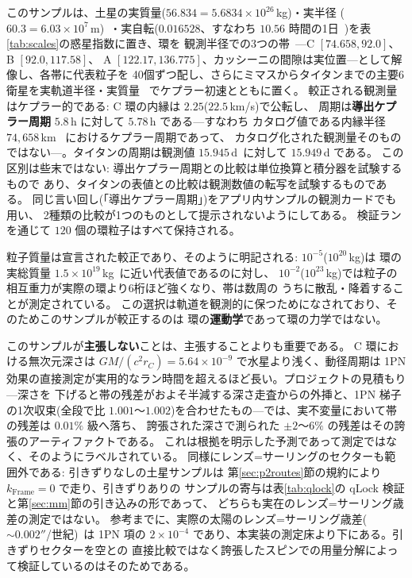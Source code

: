 \documentclass[a4paper,10pt,twocolumn]{ltjsarticle}
\begin{document}
このサンプルは、土星の実質量($56.834=5.6834\times10^{26}$\,kg)・実半径
($60.3=6.03\times10^{7}$\,m)~\cite{Prsa2016,NASAFact}・実自転($0.016528$、すなわち
$10.56$ 時間の1日~\cite{Mankovich2019})を表\ref{tab:scales}の惑星指数に置き、環を
観測半径での3つの帯~\cite{NASAFact}---C $[74.658,92.0]$、B $[92.0,117.58]$、
A $[122.17,136.775]$、カッシーニの間隙は実位置---として解像し、各帯に代表粒子を
40個ずつ配し、さらにミマスからタイタンまでの主要6衛星を実軌道半径・実質量
~\cite{Jacobson2006,NASAFact}でケプラー初速とともに置く。
較正される観測量はケプラー的である: C 環の内縁は $2.25$($22.5$\,km/s)で公転し、
周期は\textbf{導出ケプラー周期} $5.8$\,h に対して $5.78$\,h である---すなわち
カタログ値である内縁半径 $74{,}658$\,km~\cite{NASAFact} におけるケプラー周期であって、
カタログ化された観測量そのものではない---。タイタンの周期は観測値
$15.945$\,d~\cite{Jacobson2006,NASAFact}に対して $15.949$\,d である。
この区別は些末ではない: 導出ケプラー周期との比較は単位換算と積分器を試験するもので
あり、タイタンの表値との比較は観測数値の転写を試験するものである。
同じ言い回し(「導出ケプラー周期」)をアプリ内サンプルの観測カードでも用い、
2種類の比較が1つのものとして提示されないようにしてある。
検証ランを通じて $120$ 個の環粒子はすべて保持される。

粒子質量は宣言された較正であり、そのように明記される: $10^{-5}$($10^{20}$\,kg)は
環の実総質量 $1.5\times10^{19}$\,kg~\cite{Iess2019}に近い代表値であるのに対し、
$10^{-2}$($10^{23}$\,kg)では粒子の相互重力が実際の環より6桁ほど強くなり、帯は数周の
うちに散乱・降着することが測定されている。
この選択は軌道を観測的に保つためになされており、そのためこのサンプルが較正するのは
環の\textbf{運動学}であって環の力学ではない。

このサンプルが\textbf{主張しない}ことは、主張することよりも重要である。
C 環における無次元深さは $GM/(c^{2}r_C)=5.64\times10^{-9}$ で水星より浅く、動径周期は
1PN 効果の直接測定が実用的なラン時間を超えるほど長い。プロジェクトの見積もり---深さを
下げると帯の残差がおよそ半減する深さ走査からの外挿と、1PN 梯子の1次収束(全段で比
$1.001$〜$1.002$)を合わせたもの---では、実不変量において帯の残差は $0.01\%$ 級へ落ち、
誇張された深さで測られた $\pm2$〜$6\%$ の残差はその誇張のアーティファクトである。
これは根拠を明示した予測であって測定ではなく、そのようにラベルされている。
同様にレンズ=サーリングのセクターも範囲外である: 引きずりなしの土星サンプルは
第\ref{sec:p2routes}節の規約により $k_{\mathrm{Frame}}=0$ で走り、引きずりありの
サンプルの寄与は表\ref{tab:qlock}の qLock 検証と第\ref{sec:mm}節の引き込みの形であって、
どちらも実在のレンズ=サーリング歳差の測定ではない。
参考までに、実際の太陽のレンズ=サーリング歳差($\sim0.002''$/世紀)~\cite{IorioEtAl2011}は
1PN 項の $2\times10^{-4}$ であり、本実装の測定床より下にある。引きずりセクターを空との
直接比較ではなく誇張したスピンでの用量分解によって検証しているのはそのためである。
\end{document}
